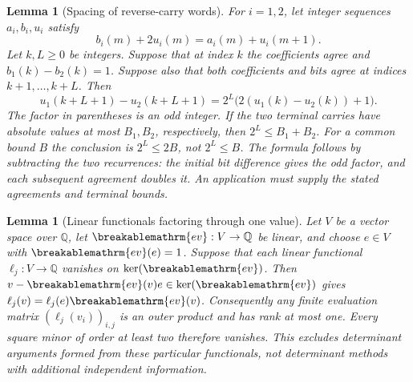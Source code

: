 \documentclass[11pt]{article}
\theoremstyle{plain}
\newtheorem{lem}[thm]{Lemma}
\theoremstyle{definition}
\theoremstyle{remark}
\renewcommand{\mathrm}[1]{\ifmmode\breakablemathrm{#1}\else\textrm{#1}\fi}%
\begin{document}
\begin{lem}[Spacing of reverse-carry words]
\label{lem:reverse-carry-word}
For $i=1,2$, let integer sequences $a_i,b_i,u_i$ satisfy
\[
 b_i(m)+2u_i(m)=a_i(m)+u_i(m+1).
\]
Let $k,L\ge0$ be integers.  Suppose that at index $k$ the coefficients agree and
$b_1(k)-b_2(k)=1$.  Suppose also that both coefficients and bits
agree at indices $k+1,\ldots,k+L$.  Then
\[
 u_1(k+L+1)-u_2(k+L+1)
   =2^L\bigl(2(u_1(k)-u_2(k))+1\bigr).
\]
The factor in parentheses is an odd integer.  If the two terminal
carries have absolute values at most $B_1,B_2$, respectively, then
$2^L\le B_1+B_2$.  For a common bound $B$ the conclusion is
$2^L\le2B$, not $2^L\le B$.
The formula follows by subtracting the two recurrences: the
initial bit difference gives the odd factor, and each subsequent
agreement doubles it.  An application must supply the stated
agreements and terminal bounds.
\end{lem}

\begin{lem}[Linear functionals factoring through one value]
\label{lem:linear-channel-nogo}
Let $V$ be a vector space over $\mathbb Q$, let
$\mathrm{ev}:V\to\mathbb Q$ be linear, and choose $e\in V$ with
$\mathrm{ev}(e)=1$.  Suppose that each linear functional
$\ell_j:V\to\mathbb Q$ vanishes on $\ker(\mathrm{ev})$.
Then $v-\mathrm{ev}(v)e\in\ker(\mathrm{ev})$ gives
$\ell_j(v)=\ell_j(e)\mathrm{ev}(v)$.
Consequently any finite evaluation matrix $(\ell_j(v_i))_{i,j}$ is an
outer product and has rank at most one.  Every square minor of order
at least two therefore vanishes.  This excludes determinant arguments
formed from these particular functionals, not determinant methods
with additional independent information.
\end{lem}
\end{document}
